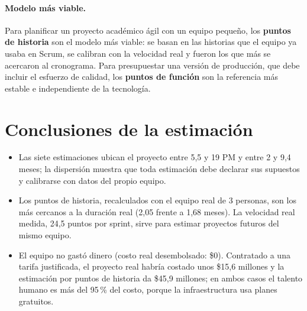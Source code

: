 \paragraph{Modelo más viable.} Para planificar un proyecto académico ágil con un equipo pequeño, los \textbf{puntos de historia} son el modelo más viable: se basan en las historias que el equipo ya usaba en Scrum, se calibran con la velocidad real y fueron los que más se acercaron al cronograma. Para presupuestar una versión de producción, que debe incluir el esfuerzo de calidad, los \textbf{puntos de función} son la referencia más estable e independiente de la tecnología.

\section{Conclusiones de la estimación}

\begin{itemize}
  \item Las siete estimaciones ubican el proyecto entre 5,5 y 19 PM y entre 2 y 9,4 meses; la dispersión muestra que toda estimación debe declarar sus supuestos y calibrarse con datos del propio equipo.
  \item Los puntos de historia, recalculados con el equipo real de 3 personas, son los más cercanos a la duración real (2,05 frente a 1,68 meses). La velocidad real medida, 24,5 puntos por sprint, sirve para estimar proyectos futuros del mismo equipo.
  \item El equipo no gastó dinero (costo real desembolsado: \$0). Contratado a una tarifa justificada, el proyecto real habría costado unos \$15,6 millones y la estimación por puntos de historia da \$45,9 millones; en ambos casos el talento humano es más del 95\,\% del costo, porque la infraestructura usa planes gratuitos.
\end{itemize}
